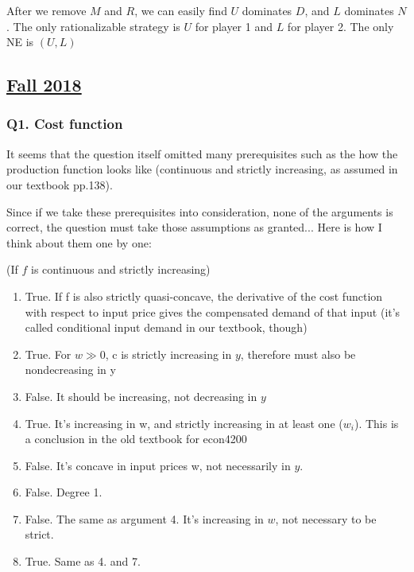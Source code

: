 \documentclass{article}
\begin{document}
\smallskip

After we remove $M$ and $R$, we can easily find $U$ dominates $D$, and $L$ dominates $N$. The only rationalizable strategy is $U$ for player 1 and $L$ for player 2. The only NE is $(U,L)$


\subsection{\href{https://www.uio.no/studier/emner/sv/oekonomi/ECON3200/previous-exams/econ32_4200-2018h.pdf}{Fall 2018}}

\subsubsection{Q1.  Cost function}

It seems that the question itself omitted many prerequisites such as the how the production function looks like (continuous and strictly increasing, as assumed in our textbook pp.138).

\medskip

Since if we take these prerequisites into consideration, none of the arguments is correct, the question must take those assumptions as granted... Here is how I think about them one by one:

\medskip

(If $f$ is continuous and strictly increasing)
\begin{enumerate}
\item True. If f is also strictly quasi-concave, the derivative of the cost function with respect to input price gives the compensated demand of that input (it's called conditional input demand in our textbook, though)
\item True. For $w \gg 0$, c is strictly increasing in $y$, therefore must also be nondecreasing in y
\item False. It should be increasing, not decreasing in $y$
\item True. It's increasing in w, and strictly increasing in at least one ($w_i$). This is a conclusion in the old textbook for econ4200
\item False. It's concave in input prices w, not necessarily in $y$. 
\item False. Degree 1.
\item False. The same as argument 4. It's increasing in $w$, not necessary to be strict.
\item True. Same as 4. and 7.
\end{enumerate}
\end{document}

